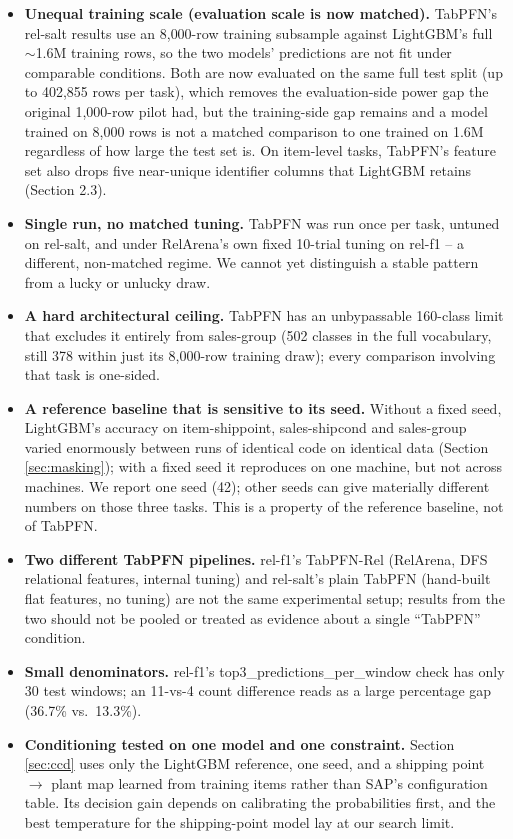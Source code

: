 \documentclass[11pt]{article}
\begin{document}
\begin{itemize}
\item \textbf{Unequal training scale (evaluation scale is now matched).} TabPFN's rel-salt
  results use an 8{,}000-row training subsample against LightGBM's full $\sim$1.6M training
  rows, so the two models' predictions are not fit under comparable conditions. Both are now
  evaluated on the same full test split (up to 402{,}855 rows per task), which removes the
  evaluation-side power gap the original 1{,}000-row pilot had, but the training-side gap
  remains and a model trained on 8{,}000 rows is not a matched comparison to one trained on
  1.6M regardless of how large the test set is. On item-level tasks, TabPFN's feature set also
  drops five near-unique identifier columns that LightGBM retains (Section 2.3).
\item \textbf{Single run, no matched tuning.} TabPFN was run once per task, untuned on
  rel-salt, and under RelArena's own fixed 10-trial tuning on rel-f1 -- a different,
  non-matched regime. We cannot yet distinguish a stable pattern from a lucky or unlucky draw.
\item \textbf{A hard architectural ceiling.} TabPFN has an unbypassable 160-class limit that
  excludes it entirely from sales-group (502 classes in the full vocabulary, still 378 within
  just its 8{,}000-row training draw); every comparison involving that task is one-sided.
\item \textbf{A reference baseline that is sensitive to its seed.} Without a fixed seed,
  LightGBM's accuracy on item-shippoint, sales-shipcond and sales-group varied enormously
  between runs of identical code on identical data (Section \ref{sec:masking}); with a fixed
  seed it reproduces on one machine, but not across machines. We report one seed (42); other
  seeds can give materially different numbers on those three tasks. This is a property of the
  reference baseline, not of TabPFN.
\item \textbf{Two different TabPFN pipelines.} rel-f1's TabPFN-Rel (RelArena, DFS relational
  features, internal tuning) and rel-salt's plain TabPFN (hand-built flat features, no
  tuning) are not the same experimental setup; results from the two should not be pooled or
  treated as evidence about a single ``TabPFN'' condition.
\item \textbf{Small denominators.} rel-f1's top3\_predictions\_per\_window check has only 30
  test windows; an 11-vs-4 count difference reads as a large percentage gap (36.7\% vs.\
  13.3\%).
\item \textbf{Conditioning tested on one model and one constraint.} Section \ref{sec:ccd} uses
  only the LightGBM reference, one seed, and a shipping point $\to$ plant map learned from
  training items rather than SAP's configuration table. Its decision gain depends on
  calibrating the probabilities first, and the best temperature for the shipping-point model lay
  at our search limit.
\end{itemize}
\end{document}
